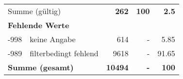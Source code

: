 \begin{longtable}{lXrrr}
     \midrule
     \multicolumn{2}{l}{Summe (gültig)} &
       \textbf{\num{262}} &
     \textbf{\num{100}} &
       \textbf{\num[round-mode=places,round-precision=2]{2.5}} \\
     \multicolumn{5}{l}{\textbf{Fehlende Werte}}\\
       -998 &
       keine Angabe &
         \num{614} &
        - &
         \num[round-mode=places,round-precision=2]{5.85} \\
       -989 &
       filterbedingt fehlend &
         \num{9618} &
        - &
         \num[round-mode=places,round-precision=2]{91.65} \\
     \midrule
     \multicolumn{2}{l}{\textbf{Summe (gesamt)}} &
          \textbf{\num{10494}} &
        \textbf{-} &
        \textbf{\num{100}} \\
     \bottomrule
     \end{longtable}
     
